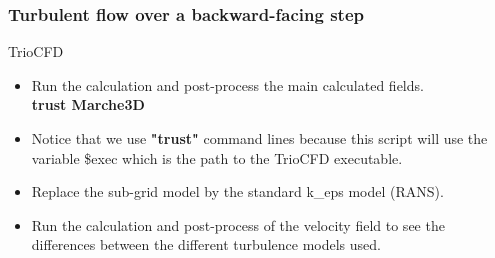 \documentclass[10pt, hyperref={unicode=true,pdfusetitle, bookmarks=true,bookmarksnumbered=false,bookmarksopen=false, breaklinks=false,pdfborder={0 0 1},backref=true,colorlinks=true,linkcolor=darkblue,pageanchor}]{beamer}
\begin{document}
\begin{frame}
\frametitle{Turbulent flow over a backward-facing step}
\begin{block}{TrioCFD}

\begin{itemize}

\item Run the calculation and post-process the main calculated fields.\\
\textbf{trust Marche3D} \\

\item Notice that we use \textbf{"trust"} command lines because this script will use the variable \$exec which is the path to the TrioCFD executable.

\item Replace the sub-grid model by the standard k\_eps model (RANS).
\item Run the calculation and post-process of the velocity field to see the differences between the different turbulence models used.
\end{itemize}

\end{block}
\end{frame}
\end{document}
